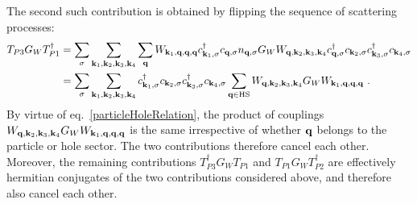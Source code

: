 \documentclass{revtex4-2}
\begin{document}
The second such contribution is obtained by flipping the sequence of scattering processes:
\begin{equation}\begin{aligned}
	T_{P3} G_W T_{P1}^\dagger &= \sum_\sigma\sum_{{\bf k}_1, {\bf k}_2, {\bf k}_3, {\bf k}_4} \sum_{\bf q} W_{{\bf k}_1,{\bf q},{\bf q},{\bf q}} c^\dagger_{{\bf k}_1,\sigma}c_{{\bf q},\sigma} n_{{\bf q},\sigma} G_W W_{{\bf q},{\bf k}_2,{\bf k}_3,{\bf k}_4}c^\dagger_{{\bf q},\sigma}c_{{\bf k}_2,\sigma}c^\dagger_{{\bf k}_3,\sigma}c_{{\bf k}_4,\sigma} \\
							  &= \sum_\sigma\sum_{{\bf k}_1, {\bf k}_2, {\bf k}_3, {\bf k}_4} c^\dagger_{{\bf k}_1,\sigma} c_{{\bf k}_2,\sigma}c^\dagger_{{\bf k}_3,\sigma}c_{{\bf k}_4,\sigma} \sum_{\bf q \in \text{HS}} W_{{\bf q},{\bf k}_2,{\bf k}_3,{\bf k}_4} G_W W_{{\bf k}_1,{\bf q},{\bf q},{\bf q}}~.
\end{aligned}\end{equation}
By virtue of eq.~\ref{particleHoleRelation}, the product of couplings \(W_{{\bf q},{\bf k}_2,{\bf k}_3,{\bf k}_4} G_W W_{{\bf k}_1,{\bf q},{\bf q},{\bf q}}\) is the same irrespective of whether \({\bf q}\) belongs to the particle or hole sector. The two contributions therefore cancel each other. Moreover, the remaining contributions \(T_{P3}^\dagger G_W T_{P1}\) and \(T_{P1}G_W T_{P2}^\dagger\) are effectively hermitian conjugates of the two contributions considered above, and therefore also cancel each other.
\end{document}
